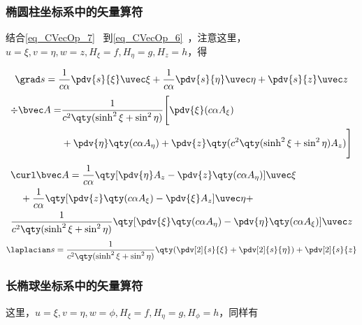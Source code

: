 \subsubsection{椭圆柱坐标系中的矢量算符}
结合\autoref{eq_CVecOp_7}~ 到\autoref{eq_CVecOp_6}~，注意这里，$u=\xi,v=\eta,w=z,H_\xi=f,H_\eta=g,H_z=h$，得

\begin{equation}
\grad s = \frac{1}{c\alpha} \pdv{s}{\xi}\uvec \xi + \frac{1}{c\alpha}\pdv{s}{\eta} \uvec \eta +  \pdv{s}{z}\uvec z
\end{equation}
\begin{equation}
\begin{aligned}
\div \bvec A = &\frac{1}{c^2\qty(\sinh^2\xi+\sin^2\eta)}\Bigg[\pdv{\xi}(c\alpha A_\xi) \\&+ \pdv{\eta}\qty(c\alpha A_\eta) + \pdv{z}\qty(c^2\qty(\sinh^2\xi+\sin^2\eta)A_z)\Bigg]
\end{aligned}
\end{equation}
\begin{equation}
\begin{aligned}
&\curl \bvec A = \frac{1}{c\alpha}\qty[\pdv{\eta}A_z - \pdv{z}\qty(c\alpha A_\eta)]\uvec \xi\\
&\quad + \frac{1}{c\alpha}\qty[\pdv{z}\qty(c\alpha A_\xi) - \pdv{\xi}A_z]\uvec \eta
+ \\
&\frac{1}{c^2\qty(\sinh^2\xi+\sin^2\eta)}\qty[\pdv{\xi}\qty(c\alpha A_\eta) - \pdv{\eta}\qty(c\alpha A_\xi)]\uvec z
\end{aligned}
\end{equation}
\begin{equation}
\laplacian s = \frac{1}{c^2\qty(\sinh^2\xi+\sin^2\eta)}\qty(\pdv[2]{s}{\xi} + \pdv[2]{s}{\eta} )+ \pdv[2]{s}{z}
\end{equation}

\subsubsection{长椭球坐标系中的矢量算符}
这里，$u=\xi,v=\eta,w=\phi,H_\xi=f,H_\eta=g,H_\phi=h$，同样有

